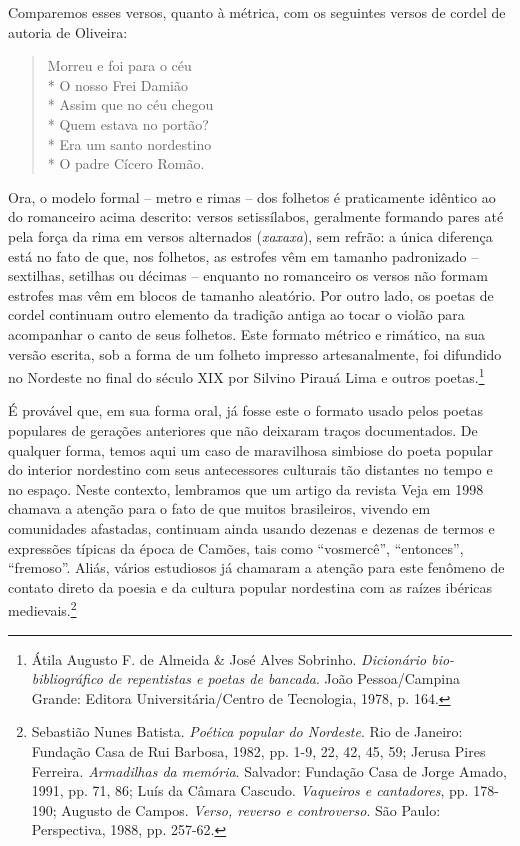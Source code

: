 Comparemos esses versos, quanto à métrica, com os
seguintes versos de cordel de autoria de Oliveira:

\begin{verse}

Morreu e foi para o céu\\*
O nosso Frei Damião\\*
Assim que no céu chegou\\*
Quem estava no portão?\\*
Era um santo nordestino\\*
O padre Cícero Romão.

\end{verse}

Ora, o modelo formal -- metro e rimas -- dos folhetos
é praticamente idêntico ao do romanceiro acima descrito:
versos setissílabos, geralmente formando pares até pela
força da rima em versos alternados (\textit{xaxaxa}), sem refrão:
a única diferença está no fato de que, nos folhetos, as estrofes
vêm em tamanho padronizado -- sextilhas, setilhas ou
décimas -- enquanto no romanceiro os versos não formam
estrofes mas vêm em blocos de tamanho aleatório. Por outro
lado, os poetas de cordel continuam outro elemento da
tradição antiga ao tocar o violão para acompanhar o canto
de seus folhetos. Este formato métrico e rimático, na sua
versão escrita, sob a forma de um folheto impresso
artesanalmente, foi difundido no Nordeste no final do século
XIX por Silvino Pirauá Lima e outros poetas.\footnote{ Átila Augusto F.
de Almeida \& José Alves Sobrinho. \textit{Dicionário bio-bibliográfico
de repentistas e poetas de bancada}. João Pessoa/Campina
Grande: Editora Universitária/Centro de Tecnologia, 1978,
p. 164.}

É provável que, em sua forma oral, já fosse este o formato
usado pelos poetas populares de gerações anteriores que não
deixaram traços documentados. De qualquer forma, temos
aqui um caso de maravilhosa simbiose do poeta popular do
interior nordestino com seus antecessores culturais tão
distantes no tempo e no espaço. Neste contexto, lembramos
que um artigo da revista Veja em 1998 chamava a atenção
para o fato de que muitos brasileiros, vivendo em
comunidades afastadas, continuam ainda usando dezenas e
dezenas de termos e expressões típicas da época de Camões,
tais como ``vosmercê'', ``entonces'', ``fremoso''. Aliás, vários 
estudiosos já chamaram a atenção para este fenômeno de
contato direto da poesia e da cultura popular nordestina com
as raízes ibéricas medievais.\footnote{ Sebastião Nunes Batista. \textit{Poética
popular do Nordeste}. Rio de Janeiro: Fundação Casa de Rui
Barbosa, 1982, pp. 1-9, 22, 42, 45, 59; Jerusa Pires Ferreira.
\textit{Armadilhas da memória}. Salvador: Fundação Casa de Jorge
Amado, 1991, pp. 71, 86; Luís da Câmara Cascudo. \textit{Vaqueiros
e cantadores}, pp. 178-190; Augusto de Campos. \textit{Verso, reverso e
controverso}. São Paulo: Perspectiva, 1988, pp. 257-62.}

